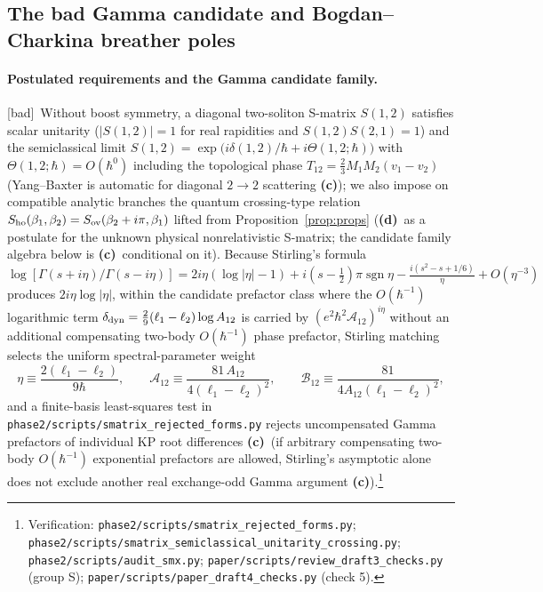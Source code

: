 \documentclass[11pt,a4paper]{article}
\newcommand{\lab}[1]{{\normalfont\sffamily\footnotesize\bfseries(#1)}}
\newcommand{\Lc}{\lab{c}}
\newcommand{\Ld}{\lab{d}}
\newcommand{\eqtag}[2]{{\normalfont\sffamily\footnotesize\textcolor{#1}{[#2]}}}
\newcommand{\Bad}{\eqtag{red!60!black}{bad}}
\newcommand{\scr}[1]{\nolinkurl{#1}}
\newcommand{\chk}[1]{\footnote{\raggedright Verification: #1.}}
\newcommand{\hb}{\hbar}
\newcommand{\sgn}{\operatorname{sgn}}
\theoremstyle{remark}
\begin{document}
\subsection{The bad Gamma candidate and Bogdan--Charkina breather poles}\label{sec:badgamma}

\paragraph{Postulated requirements and the Gamma candidate family.} \Bad\ Without boost symmetry, a diagonal two-soliton S-matrix $S(1,2)$ satisfies scalar unitarity ($|S(1,2)|=1$ for real rapidities and $S(1,2)S(2,1)=1$) and the semiclassical limit $S(1,2)=\exp\big(i\delta(1,2)/\hb+i\Theta(1,2;\hb)\big)$ with $\Theta(1,2;\hb)=O(\hb^0)$ including the topological phase $T_{12}=\tfrac23M_1M_2(v_1-v_2)$ (Yang--Baxter is automatic for diagonal $2\to2$ scattering \Lc); we also impose on compatible analytic branches the quantum crossing-type relation $S_{\rm ho}(\beta_1,\beta_2)=S_{\rm ov}(\beta_2+i\pi,\beta_1)$ lifted from Proposition~\ref{prop:props} (\Ld\ as a postulate for the unknown physical nonrelativistic S-matrix; the candidate family algebra below is \Lc\ conditional on it). Because Stirling's formula $\log[\Gamma(s+i\eta)/\Gamma(s-i\eta)]=2i\eta(\log|\eta|-1)+i(s-\tfrac12)\pi\sgn\eta-\frac{i(s^2-s+1/6)}{\eta}+O(\eta^{-3})$ produces $2i\eta\log|\eta|$, within the candidate prefactor class where the $O(\hb^{-1})$ logarithmic term $\delta_{\rm dyn}=\tfrac29(\ell_1-\ell_2)\log A_{12}$ is carried by $(e^2\hb^2\mathcal A_{12})^{i\eta}$ without an additional compensating two-body $O(\hb^{-1})$ phase prefactor, Stirling matching selects the uniform spectral-parameter weight
\begin{equation}\label{eq:etadef}
\eta\equiv\frac{2(\ell_1-\ell_2)}{9\hb},\qquad
\mathcal A_{12}\equiv\frac{81\,A_{12}}{4(\ell_1-\ell_2)^2},\qquad
\mathcal B_{12}\equiv\frac{81}{4A_{12}(\ell_1-\ell_2)^2},
\end{equation}
and a finite-basis least-squares test in \scr{phase2/scripts/smatrix_rejected_forms.py} rejects uncompensated Gamma prefactors of individual KP root differences \Lc\ (if arbitrary compensating two-body $O(\hb^{-1})$ exponential prefactors are allowed, Stirling's asymptotic alone does not exclude another real exchange-odd Gamma argument \Lc).\chk{\scr{phase2/scripts/smatrix_rejected_forms.py}; \scr{phase2/scripts/smatrix_semiclassical_unitarity_crossing.py}; \scr{phase2/scripts/audit_smx.py}; \scr{paper/scripts/review_draft3_checks.py} (group S); \scr{paper/scripts/paper_draft4_checks.py} (check 5)}
\end{document}
